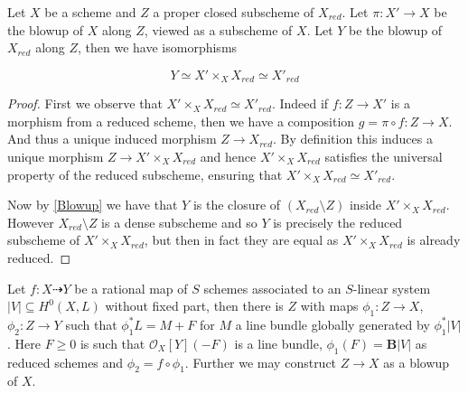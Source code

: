 \documentclass[a4paper,12pt]{book}
\newcommand{\BB}{\mathbf{B}}
\newcommand{\ox}{\mathcal{O}_{X}}
\begin{document}
\begin{lemma}\label{Blowup}
	
	Let $X$ be a scheme and $Z$ a proper closed subscheme of $X_{red}$. Let $\pi:X' \to X$ be the blowup of $X$ along $Z$, viewed as a subscheme of $X$. Let $Y$ be the blowup of $X_{red}$ along $Z$, then we have isomorphisms
	
	\[Y \simeq X'\times_{X} X_{red} \simeq X'_{red}\]
	
\end{lemma}
\begin{proof}
	
	First we observe that $X'\times_{X} X_{red} \simeq X'_{red}$. Indeed if $f:Z \to X'$ is a morphism from a reduced scheme, then we have a composition $g=\pi \circ f: Z \to X$. And thus a unique induced morphism $Z \to X_{red}$. By definition this induces a unique morphism $Z \to X'\times_{X} X_{red}$ and hence $X'\times_{X} X_{red}$ satisfies the universal property of the reduced subscheme, ensuring that $X'\times_{X} X_{red} \simeq X'_{red}$.
	
	Now by \autoref{Blowup} we have that $Y$ is the closure of $(X_{red}\setminus Z)$ inside $X'\times_{X} X_{red}$. However $X_{red}\setminus Z$ is a dense subscheme and so $Y$ is precisely the reduced subscheme of $X'\times_{X} X_{red}$, but then in fact they are equal as $X'\times_{X} X_{red}$ is already reduced.
	
	
\end{proof}

\begin{lemma}\label{elim}
	Let $f: X \dashrightarrow Y$ be a rational map of $S$ schemes associated to an $S$-linear system $|V|\subseteq H^{0}(X,L)$ without fixed part, then there is $Z$ with maps $\phi_{1}:Z \to X$, $\phi_{2}:Z \to Y$ such that $\phi_{1}^{*}L=M+F$ for $M$ a line bundle globally generated by $\phi_{1}^{*}|V|$. Here $F \geq 0$ is such that $\ox[Y](-F)$ is a line bundle, $\phi_{1}(F)=\BB|V|$ as reduced schemes and $\phi_{2}=f\circ \phi_{1}$. Further we may construct $Z \to X$ as a blowup of $X$.
\end{lemma}
\end{document}
